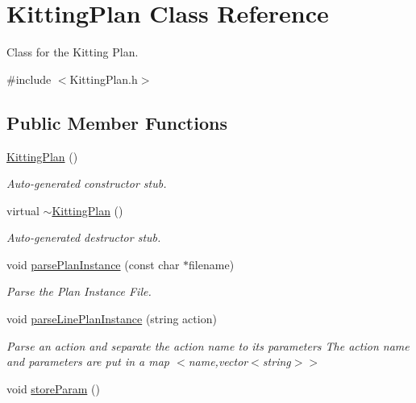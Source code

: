 \hypertarget{class_kitting_plan}{
\section{KittingPlan Class Reference}
\label{class_kitting_plan}
}


Class for the Kitting Plan.  




{\ttfamily \#include $<$KittingPlan.h$>$}

\subsection*{Public Member Functions}
\begin{DoxyCompactItemize}
\item 
\hyperlink{class_kitting_plan_a3013cec44a59c122717b875bd5450bc7}{KittingPlan} ()
\begin{DoxyCompactList}\small\item\em Auto-\/generated constructor stub. \item\end{DoxyCompactList}\item 
virtual \hyperlink{class_kitting_plan_a73d39332e539a32bfd6d5b590472eead}{$\sim$KittingPlan} ()
\begin{DoxyCompactList}\small\item\em Auto-\/generated destructor stub. \item\end{DoxyCompactList}\item 
void \hyperlink{class_kitting_plan_a031d08c0a78ce49a2be450ef59f42fde}{parsePlanInstance} (const char $\ast$filename)
\begin{DoxyCompactList}\small\item\em Parse the Plan Instance File. \item\end{DoxyCompactList}\item 
void \hyperlink{class_kitting_plan_ac11362f185f0a72e6ccc443674fa1ac0}{parseLinePlanInstance} (string action)
\begin{DoxyCompactList}\small\item\em Parse an action and separate the action name to its parameters The action name and parameters are put in a map $<$name,vector$<$string$>$$>$ \item\end{DoxyCompactList}\item 
void \hyperlink{class_kitting_plan_a76444470a007c13ea215beeb11c3b3ca}{storeParam} ()

\end{DoxyCompactItemize}
